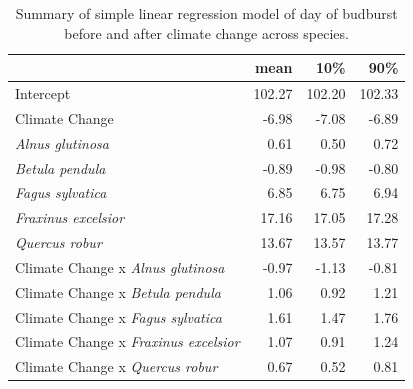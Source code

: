 \documentclass{article}\usepackage[]{graphicx}\usepackage[]{color}
\begin{document}
\begin{table}[H]
\centering
\caption{Summary of simple linear regression model of day of budburst before and after climate change across species.} 
\label{tab:simbbmod}
\begin{tabular}{lrrr}
  \hline
 & mean & 10\% & 90\% \\ 
  \hline
Intercept & 102.27 & 102.20 & 102.33 \\ 
  Climate Change & -6.98 & -7.08 & -6.89 \\ 
  \textit{Alnus glutinosa} & 0.61 & 0.50 & 0.72 \\ 
  \textit{Betula pendula} & -0.89 & -0.98 & -0.80 \\ 
  \textit{Fagus sylvatica} & 6.85 & 6.75 & 6.94 \\ 
  \textit{Fraxinus excelsior} & 17.16 & 17.05 & 17.28 \\ 
  \textit{Quercus robur} & 13.67 & 13.57 & 13.77 \\ 
  Climate Change x \textit{Alnus glutinosa} & -0.97 & -1.13 & -0.81 \\ 
  Climate Change x \textit{Betula pendula} & 1.06 & 0.92 & 1.21 \\ 
  Climate Change x \textit{Fagus sylvatica} & 1.61 & 1.47 & 1.76 \\ 
  Climate Change x \textit{Fraxinus excelsior} & 1.07 & 0.91 & 1.24 \\ 
  Climate Change x \textit{Quercus robur} & 0.67 & 0.52 & 0.81 \\ 
   \hline
\end{tabular}
\end{table}
\end{document}
